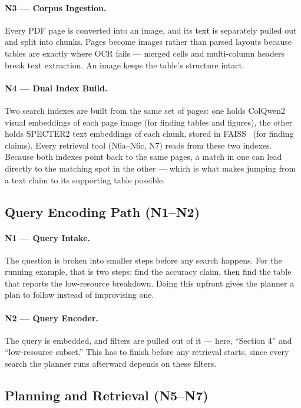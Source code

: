 \paragraph{N3 --- Corpus Ingestion.}
Every PDF page is converted into an image, and its text is separately pulled out
and split into chunks. Pages become images rather than parsed layouts because
tables are exactly where OCR fails --- merged cells and multi-column headers break
text extraction. An image keeps the table's structure intact.

\paragraph{N4 --- Dual Index Build.}
Two search indexes are built from the same set of pages: one holds ColQwen2
visual embeddings of each page image (for finding tables and figures), the other
holds SPECTER2 text embeddings of each chunk, stored in FAISS~\cite{johnson2019faiss}
(for finding claims). Every retrieval tool (N6a--N6c, N7) reads from these two
indexes. Because both indexes point back
to the same pages, a match in one can lead directly to the matching spot in the
other --- which is what makes jumping from a text claim to its supporting table
possible.

\subsection{Query Encoding Path (N1--N2)}

\paragraph{N1 --- Query Intake.}
The question is broken into smaller steps before any search happens. For the
running example, that is two steps: find the accuracy claim, then find the table
that reports the low-resource breakdown. Doing this upfront gives the planner a
plan to follow instead of improvising one.

\paragraph{N2 --- Query Encoder.}
The query is embedded, and filters are pulled out of it --- here, ``Section 4'' and
``low-resource subset.'' This has to finish before any retrieval starts, since
every search the planner runs afterward depends on these filters.

\subsection{Planning and Retrieval (N5--N7)}

